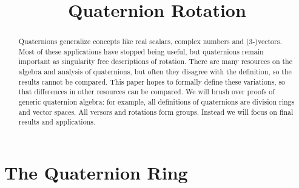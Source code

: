 \documentclass{amsart}
\theoremstyle{definition}
\theoremstyle{remark}
\numberwithin{equation}{section}
\begin{document}
\title{Quaternion Rotation}

\begin{abstract}
  Quaternions generalize concepts like real scalars, complex numbers and (3-)vectors. Most of these applications have stopped being useful, but quaternions remain important as singularity free descriptions of rotation. There are many resources on the algebra and analysis of quaternions, but often they disagree with the definition, so the results cannot be compared. This paper hopes to formally define these variations, so that differences in other resources can be compared. We will brush over proofs of generic quaternion algebra: for example, all definitions of quaternions are division rings and vector spaces. All versors and rotations form groups. Instead we will focus on final results and applications.
\end{abstract}

\maketitle

\section{The Quaternion Ring}
\end{document}
